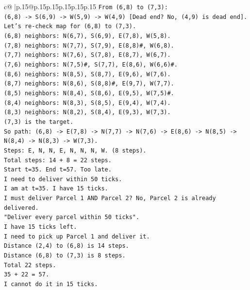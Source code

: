 \documentclass{article}
\begin{document}
{\begin{supertabular}{c@{$\;$}|p{.15\linewidth}@{}p{.15\linewidth}p{.15\linewidth}p{.15\linewidth}p{.15\linewidth}p{.15\linewidth}}
{{{\texttt{From (6,8) to (7,3):} \\
\texttt{(6,8) {-}> S(6,9) {-}> W(5,9) {-}> W(4,9) {[}Dead end? No, (4,9) is dead end{]}.} \\
\texttt{Let's re{-}check map for (6,8) to (7,3).} \\
\texttt{(6,8) neighbors: N(6,7), S(6,9), E(7,8), W(5,8).} \\
\texttt{(7,8) neighbors: N(7,7), S(7,9), E(8,8)\#, W(6,8).} \\
\texttt{(7,7) neighbors: N(7,6), S(7,8), E(8,7), W(6,7).} \\
\texttt{(7,6) neighbors: N(7,5)\#, S(7,7), E(8,6), W(6,6)\#.} \\
\texttt{(8,6) neighbors: N(8,5), S(8,7), E(9,6), W(7,6).} \\
\texttt{(8,7) neighbors: N(8,6), S(8,8)\#, E(9,7), W(7,7).} \\
\texttt{(8,5) neighbors: N(8,4), S(8,6), E(9,5), W(7,5)\#.} \\
\texttt{(8,4) neighbors: N(8,3), S(8,5), E(9,4), W(7,4).} \\
\texttt{(8,3) neighbors: N(8,2), S(8,4), E(9,3), W(7,3).} \\
\texttt{(7,3) is the target.} \\
\texttt{So path: (6,8) {-}> E(7,8) {-}> N(7,7) {-}> N(7,6) {-}> E(8,6) {-}> N(8,5) {-}> N(8,4) {-}> N(8,3) {-}> W(7,3).} \\
\texttt{Steps: E, N, N, E, N, N, N, W. (8 steps).} \\
\texttt{Total steps: 14 + 8 = 22 steps.} \\
\texttt{Start t=35. End t=57. Too late.} \\
\texttt{I need to deliver within 50 ticks.} \\
\texttt{I am at t=35. I have 15 ticks.} \\
\texttt{I must deliver Parcel 1 AND Parcel 2? No, Parcel 2 is already delivered.} \\
\texttt{"Deliver every parcel within 50 ticks".} \\
\texttt{I have 15 ticks left.} \\
\texttt{I need to pick up Parcel 1 and deliver it.} \\
\texttt{Distance (2,4) to (6,8) is 14 steps.} \\
\texttt{Distance (6,8) to (7,3) is 8 steps.} \\
\texttt{Total 22 steps.} \\
\texttt{35 + 22 = 57.} \\
\texttt{I cannot do it in 15 ticks.} \\
}}}
\end{supertabular}}
\end{document}
